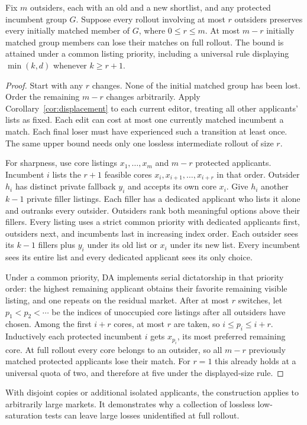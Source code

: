 \begin{theorem}\label{thm:saturation-bound}
Fix $m$ outsiders, each with an old and a new shortlist, and any protected incumbent group $G$. Suppose every rollout involving at most $r$ outsiders preserves every initially matched member of $G$, where $0\le r\le m$. At most $m-r$ initially matched group members can lose their matches on full rollout. The bound is attained under a common listing priority, including a universal rule displaying $\min(k,d)$ whenever $k\ge r+1$.
\end{theorem}
\begin{proof}
Start with any $r$ changes. None of the initial matched group has been lost. Order the remaining $m-r$ changes arbitrarily. Apply Corollary~\ref{cor:displacement} to each current editor, treating all other applicants' lists as fixed. Each edit can cost at most one currently matched incumbent a match. Each final loser must have experienced such a transition at least once. The same upper bound needs only one lossless intermediate rollout of size $r$.

For sharpness, use core listings $x_1,\ldots,x_m$ and $m-r$ protected applicants. Incumbent $i$ lists the $r+1$ feasible cores $x_i,x_{i+1},\ldots,x_{i+r}$ in that order. Outsider $h_i$ has distinct private fallback $y_i$ and accepts its own core $x_i$. Give $h_i$ another $k-1$ private filler listings. Each filler has a dedicated applicant who lists it alone and outranks every outsider. Outsiders rank both meaningful options above their fillers. Every listing uses a strict common priority with dedicated applicants first, outsiders next, and incumbents last in increasing index order. Each outsider sees its $k-1$ fillers plus $y_i$ under its old list or $x_i$ under its new list. Every incumbent sees its entire list and every dedicated applicant sees its only choice.

Under a common priority, DA implements serial dictatorship in that priority order: the highest remaining applicant obtains their favorite remaining visible listing, and one repeats on the residual market. After at most $r$ switches, let $p_1<p_2<\cdots$ be the indices of unoccupied core listings after all outsiders have chosen. Among the first $i+r$ cores, at most $r$ are taken, so $i\le p_i\le i+r$. Inductively each protected incumbent $i$ gets $x_{p_i}$, its most preferred remaining core. At full rollout every core belongs to an outsider, so all $m-r$ previously matched protected applicants lose their match. For $r=1$ this already holds at a universal quota of two, and therefore at five under the displayed-size rule.
\end{proof}
With disjoint copies or additional isolated applicants, the construction applies to arbitrarily large markets. It demonstrates why a collection of lossless low-saturation tests can leave large losses unidentified at full rollout.

